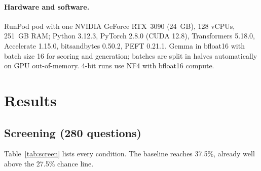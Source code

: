 \documentclass[10pt,a4paper]{article}
\begin{document}
\paragraph{Hardware and software.} RunPod pod with one NVIDIA GeForce RTX~3090 (24~GB), 128 vCPUs, 251~GB RAM;
Python 3.12.3, PyTorch 2.8.0 (CUDA 12.8), Transformers 5.18.0, Accelerate 1.15.0, bitsandbytes 0.50.2, PEFT 0.21.1.
Gemma in bfloat16 with batch size 16 for scoring and generation; batches are split in halves automatically on GPU
out-of-memory. 4-bit runs use NF4 with bfloat16 compute.

\section{Results}\label{sec:results}
\subsection{Screening (280 questions)}
Table~\ref{tab:screen} lists every condition. The baseline reaches 37.5\%, already well above the 27.5\% chance line.
\end{document}
